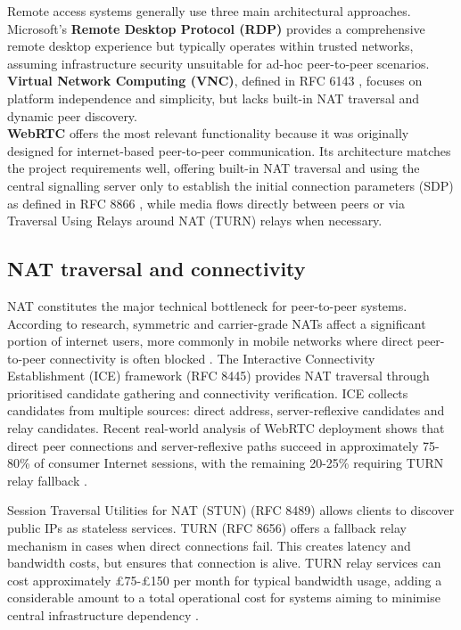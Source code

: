 \documentclass[12pt,a4paper]{article}
\begin{document}
Remote access systems generally use three main architectural approaches. \\
Microsoft's \textbf{Remote Desktop Protocol (RDP)} \cite{DH23} provides a comprehensive remote desktop experience but typically operates within trusted networks, assuming infrastructure security unsuitable for ad-hoc peer-to-peer scenarios.\\ 
\textbf{Virtual Network Computing (VNC)}, defined in RFC 6143 \cite{RFC6143}, focuses on platform independence and simplicity, but lacks built-in NAT traversal and dynamic peer discovery. \\
\textbf{WebRTC} \cite{KS22} offers the most relevant functionality because it was originally designed for internet-based peer-to-peer communication. Its architecture matches the project requirements well, offering built-in NAT traversal and using the central signalling server only to establish the initial connection parameters (SDP) as defined in RFC 8866 \cite{RFC8866}, while media flows directly between peers or via Traversal Using Relays around NAT (TURN) relays when necessary.

\subsection{NAT traversal and connectivity}

NAT \cite{Fay25} constitutes the major technical bottleneck for peer-to-peer systems. According to research, symmetric and carrier-grade NATs affect a significant portion of internet users, more commonly in mobile networks where direct peer-to-peer connectivity is often blocked \cite{Sha25}. The Interactive Connectivity Establishment (ICE) framework (RFC 8445) \cite{AKH18} provides NAT traversal through prioritised candidate gathering and connectivity verification. ICE collects candidates from multiple sources: direct address, server-reflexive candidates and relay candidates. Recent real-world analysis of WebRTC deployment shows that direct peer connections and server-reflexive paths succeed in approximately 75-80\% of consumer Internet sessions, with the remaining 20-25\% requiring TURN relay fallback \cite{GS25}.

Session Traversal Utilities for NAT (STUN) (RFC 8489) \cite{PHR20} allows clients to discover public IPs as stateless services. TURN (RFC 8656) \cite{TRM20} offers a fallback relay mechanism in cases when direct connections fail. This creates latency and bandwidth costs, but ensures that connection is alive. TURN relay services can cost approximately £75-£150 per month for typical bandwidth usage, adding a considerable amount to a total operational cost for systems aiming to minimise central infrastructure dependency \cite{TURN25}.
\end{document}
